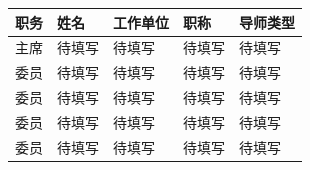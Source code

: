 
\begin{committee}[name={答辩委员会名单}]
  \begin{center}
    \begin{tabular}{@{}p{1.5cm}p{1.6cm}p{4.3cm}p{1.8cm}p{2.8cm}@{}}
      \toprule
      职务 & 姓名   & 工作单位 & 职称   & 导师类型 \\
      \midrule
      主席 & 待填写 & 待填写   & 待填写 & 待填写   \\
      委员 & 待填写 & 待填写   & 待填写 & 待填写   \\
      委员 & 待填写 & 待填写   & 待填写 & 待填写   \\
      委员 & 待填写 & 待填写   & 待填写 & 待填写   \\
      委员 & 待填写 & 待填写   & 待填写 & 待填写   \\
      \bottomrule
    \end{tabular}
  \end{center}
\end{committee}
